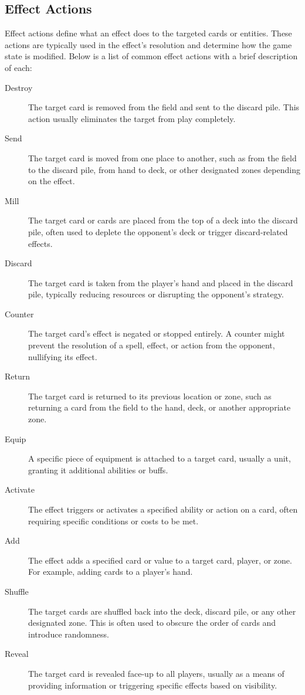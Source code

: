 \subsection{Effect Actions}
Effect actions define what an effect does to the targeted cards or entities. These actions are typically used in the effect’s resolution and determine how the game state is modified. Below is a list of common effect actions with a brief description of each:

\begin{description}
  \item[Destroy] The target card is removed from the field and sent to the discard pile. This action usually eliminates the target from play completely.  
  \item[Send] The target card is moved from one place to another, such as from the field to the discard pile, from hand to deck, or other designated zones depending on the effect.  
  \item[Mill] The target card or cards are placed from the top of a deck into the discard pile, often used to deplete the opponent's deck or trigger discard-related effects.  
  \item[Discard] The target card is taken from the player's hand and placed in the discard pile, typically reducing resources or disrupting the opponent’s strategy.  
  \item[Counter] The target card’s effect is negated or stopped entirely. A counter might prevent the resolution of a spell, effect, or action from the opponent, nullifying its effect.
  \item[Return] The target card is returned to its previous location or zone, such as returning a card from the field to the hand, deck, or another appropriate zone.  
  \item[Equip] A specific piece of equipment is attached to a target card, usually a unit, granting it additional abilities or buffs.  
  \item[Activate] The effect triggers or activates a specified ability or action on a card, often requiring specific conditions or costs to be met.  
  \item[Add] The effect adds a specified card or value to a target card, player, or zone. For example, adding cards to a player’s hand.  
  \item[Shuffle] The target cards are shuffled back into the deck, discard pile, or any other designated zone. This is often used to obscure the order of cards and introduce randomness.  
  \item[Reveal] The target card is revealed face-up to all players, usually as a means of providing information or triggering specific effects based on visibility.  

\end{description}
